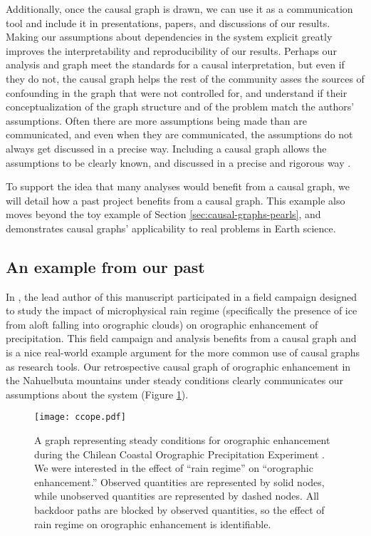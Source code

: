 \documentclass[12pt]{article}
\begin{document}
Additionally, once the causal graph is drawn, we can use it as a
communication tool and include it in presentations, papers, and
discussions of our results. Making our assumptions about dependencies
in the system explicit greatly improves the interpretability and
reproducibility of our results. Perhaps our analysis and graph meet
the standards for a causal interpretation, but even if they do not,
the causal graph helps the rest of the community asses the sources of
confounding in the graph that were not controlled for, and understand
if their conceptualization of the graph structure and of the problem
match the authors' assumptions. Often there are more assumptions being
made than are communicated, and even when they are communicated, the
assumptions do not always get discussed in a precise way. Including a
causal graph allows the assumptions to be clearly known, and discussed
in a precise and rigorous way \citep{hannart-da}.

To support the idea that many analyses would benefit from a causal
graph, we will detail how a past project benefits from a causal
graph. This example also moves beyond the toy example of Section
\ref{sec:causal-graphs-pearls}, and demonstrates causal graphs'
applicability to real problems in Earth science.

\subsection{An example from our past}

In \citet{massmann2017}, the lead author of this manuscript
participated in a field campaign designed to study the impact of
microphysical rain regime (specifically the presence of ice from aloft
falling into orographic clouds) on orographic enhancement of
precipitation. This field campaign and analysis benefits from a causal
graph and is a nice real-world example argument for the more common
use of causal graphs as research tools. Our retrospective causal graph
of orographic enhancement in the Nahuelbuta mountains under steady
conditions clearly communicates our assumptions about the system
(Figure \ref{fig:ccope}).

\begin{figure} \texttt{[image: ccope.pdf]}
  \caption{A graph representing steady conditions for orographic
    enhancement during the Chilean Coastal Orographic Precipitation
    Experiment \citep[CCOPE,][]{massmann2017}. We were interested in the
    effect of ``rain regime'' on ``orographic enhancement.''  Observed
    quantities are represented by solid nodes, while unobserved quantities
    are represented by dashed nodes. All backdoor paths are blocked by
    observed quantities, so the effect of rain regime on orographic
    enhancement is identifiable.}
  \label{fig:ccope}
\end{figure}
\end{document}
